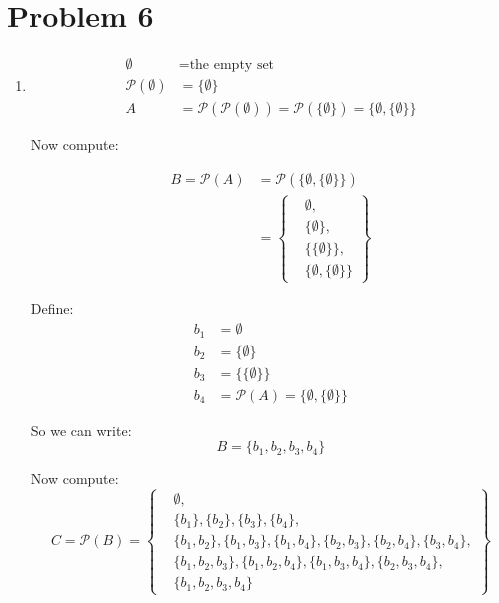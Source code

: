 \documentclass{article}
\begin{document}
\section*{Problem 6}
\begin{enumerate}
    \item %

    \begin{align*}
    \emptyset &= \text{the empty set} \\
    \mathcal{P}(\emptyset) &= \{ \emptyset \} \\
    A &= \mathcal{P}(\mathcal{P}(\emptyset)) = \mathcal{P}(\{ \emptyset \}) = \{ \emptyset, \{ \emptyset \} \}
    \end{align*}

    \vspace{1em}

    Now compute:

    \begin{align*}
    B = \mathcal{P}(A) &= \mathcal{P}(\{ \emptyset, \{ \emptyset \} \}) \\
    &= \left\{
        \begin{aligned}
        &\emptyset, \\
        &\{ \emptyset \}, \\
        &\{ \{ \emptyset \} \}, \\
        &\{ \emptyset, \{ \emptyset \} \}
        \end{aligned}
    \right\}
    \end{align*}

    \vspace{1em}

    Define:
    \[
    \begin{aligned}
    b_1 &= \emptyset \\
    b_2 &= \{ \emptyset \} \\
    b_3 &= \{ \{ \emptyset \} \} \\
    b_4 &= \mathcal{P}(A) = \{ \emptyset, \{ \emptyset \} \}
    \end{aligned}
    \]

    So we can write:
    \[
    B = \{ b_1, b_2, b_3, b_4 \}
    \]

    \vspace{1em}

    Now compute:
    \[
    C = \mathcal{P}(B) = \left\{
    \begin{aligned}
    & \emptyset, \\
    & \{ b_1 \}, \{ b_2 \}, \{ b_3 \}, \{ b_4 \}, \\
    & \{ b_1, b_2 \}, \{ b_1, b_3 \}, \{ b_1, b_4 \}, \{ b_2, b_3 \}, \{ b_2, b_4 \}, \{ b_3, b_4 \}, \\
    & \{ b_1, b_2, b_3 \}, \{ b_1, b_2, b_4 \}, \{ b_1, b_3, b_4 \}, \{ b_2, b_3, b_4 \}, \\
    & \{ b_1, b_2, b_3, b_4 \}
    \end{aligned}
    \right\}
    \]

\end{enumerate}
\end{document}
